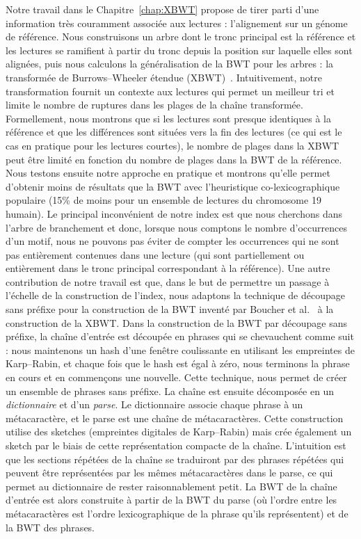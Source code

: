 Notre travail dans le Chapitre~\ref{chap:XBWT} propose de tirer parti d'une information très couramment associée aux lectures : l'alignement sur un génome de référence. Nous construisons un arbre dont le tronc principal est la référence et les lectures se ramifient à partir du tronc depuis la position sur laquelle elles sont alignées, puis nous calculons la généralisation de la BWT pour les arbres : la transformée de Burrows--Wheeler étendue (XBWT)~\cite{ferragina2009compressing}. Intuitivement, notre transformation fournit un contexte aux lectures qui permet un meilleur tri et limite le nombre de ruptures dans les plages de la chaîne transformée. Formellement, nous montrons que si les lectures sont presque identiques à la référence et que les différences sont situées vers la fin des lectures (ce qui est le cas en pratique pour les lectures courtes), le nombre de plages dans la XBWT peut être limité en fonction du nombre de plages dans la BWT de la référence. Nous testons ensuite notre approche en pratique et montrons qu'elle permet d'obtenir moins de résultats que la BWT avec l'heuristique co-lexicographique populaire (15\% de moins pour un ensemble de lectures du chromosome 19 humain).
Le principal inconvénient de notre index est que nous cherchons dans l'arbre de branchement et donc, lorsque nous comptons le nombre d'occurrences d'un motif, nous ne pouvons pas éviter de compter les occurrences qui ne sont pas entièrement contenues dans une lecture (qui sont partiellement ou entièrement dans le tronc principal correspondant à la référence).
%
Une autre contribution de notre travail est que, dans le but de permettre un passage à l'échelle de la construction de l'index, nous adaptons la technique de découpage sans préfixe pour la construction de la BWT inventé par Boucher et al.~\cite{boucher2019prefix} à la construction de la XBWT. 
%
Dans la construction de la BWT par découpage sans préfixe, la chaîne d'entrée est découpée en phrases qui se chevauchent comme suit : nous maintenons un hash d'une fenêtre coulissante en utilisant les empreintes de Karp--Rabin, et chaque fois que le hash est égal à zéro, nous terminons la phrase en cours et en commençons une nouvelle. Cette technique, nous permet de créer un ensemble de phrases sans préfixe.
La chaîne est ensuite décomposée en un \emph{dictionnaire} et d'un \emph{parse}. 
Le dictionnaire associe chaque phrase à un métacaractère, et le parse est une chaîne de métacaractères.
Cette construction utilise des sketches (empreintes digitales de Karp--Rabin) mais crée également un sketch par le biais de cette représentation compacte de la chaîne.
L'intuition est que les sections répétées de la chaîne se traduiront par des phrases répétées qui peuvent être représentées par les mêmes métacaractères dans le parse, ce qui permet au dictionnaire de rester raisonnablement petit.
La BWT de la chaîne d'entrée est alors construite à partir de la BWT du parse (où l'ordre entre les métacaractères est l'ordre lexicographique de la phrase qu'ils représentent) et de la BWT des phrases.

